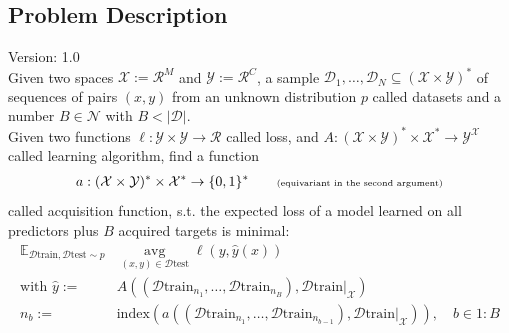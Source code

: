 \documentclass[]{article}
\begin{document}


\subsection{Problem Description}
{\color{red} Version: 1.0}\\
Given two spaces $\mathcal{X}:=\mathcal{R}^M$ and $\mathcal{Y}:=\mathcal{R}^C$, a sample $\mathcal{D}_1,\ldots,\mathcal{D}_N \subseteq (\mathcal{X}\times \mathcal{Y})^*$ of sequences of pairs $(x,y)$  from an unknown distribution $p$ called datasets and a number $B\in\mathcal{N}$ with $B < |\mathcal{D}|$. \\
Given two functions $\ell:\mathcal{Y}\times \mathcal{Y}\rightarrow \mathcal{R}$ called loss, and $A: (\mathcal{X} \times \mathcal{Y})^* \times \mathcal{X}^* \rightarrow \mathcal{Y}^{\mathcal{X}}$ called learning algorithm, find a function
\begin{align*}
	a: (\mathcal{X}\times \mathcal{Y})^* \times \mathcal{X}^* \rightarrow \{0,1\}^*
	\quad\quad \text{\tiny (equivariant in the second argument)}
\end{align*}
called acquisition function, s.t. the expected loss of a model learned on all predictors plus $B$ acquired targets is minimal:
\begin{align*}
	\mathbb{E}_{\mathcal{D}\text{train},\mathcal{D}\text{test}\sim p}   &
	\operatorname{avg}\limits_{(x,y)\in\mathcal{D}\text{test}}
	\ell(y, \hat y(x)) 
	\\
	\text{with }
	\hat y:= & A( (\mathcal{D}\text{train}_{n_1},\ldots,\mathcal{D}\text{train}_{n_B}), \mathcal{D}\text{train}|_{\mathcal{X}})
	\\ 
	n_b := & \text{index}( a( (\mathcal{D}\text{train}_{n_1},\ldots,\mathcal{D}\text{train}_{n_{b-1}}), \mathcal{D}\text{train}|_{\mathcal{X}}) ),
	\quad b\in 1{:}B
\end{align*}
\end{document}
